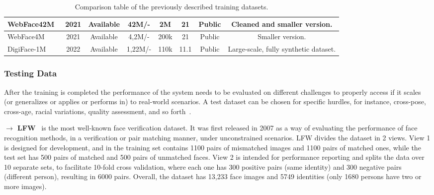 \documentclass[class=report, crop=false, a4paper, 12pt]{standalone}
\begin{document}
\begin{table}[!ht]
{\begin{tabular}{|l|c|c|c|c|c|c|c|}
    WebFace42M~\autocite{zhuWebFace260MBenchmarkUnveiling2021}                             & 2021          & Available                  & 42M/-                  & 2M             & 21                    & Public                & Cleaned and smaller version.                 \\ \hline
    WebFace4M~\autocite{zhuWebFace260MBenchmarkUnveiling2021}                              & 2021          & Available                  & 4,2M/-                 & 200k           & 21                    & Public                & Smaller version.                 \\ \hline
    DigiFace-1M~\autocite{baeDigiFace1MMillionDigital2023}                            & 2022          & Available                  & 1,22M/-                & 110k           & 11.1                  & Public                & Large-scale, fully synthetic dataset.                 \\ \hline
    \end{tabular}%
    }
    \caption{Comparison table of the previously described training datasets.}
    \label{tab:training data}
\end{table}
\newpage
\subsubsection{\large Testing Data}

\par After the training is completed the performance of the system needs to be evaluated on different challenges to properly access if it scales (or generalizes or applies or performs in) to real-world scenarios. A test dataset can be chosen for specific hurdles, for instance, cross-pose, cross-age, racial variations, quality assessment, and so forth~\autocite{duElementsEndtoendDeep2022}.


\vspace{0.7\baselineskip}
\noindent\textbf{$\rightarrow$ LFW}~\autocite{huangLabeledFacesWild} is the most well-known face verification dataset. It was first released in 2007 as a way of evaluating the performance of face recognition methods, in a verification or pair matching manner, under unconstrained scenarios. LFW divides the dataset in 2 views. View 1 is designed for development, and in the training set contains 1100 pairs of mismatched images and 1100 pairs of matched ones, while the test set has 500 pairs of matched and 500 pairs of unmatched faces. View 2 is intended for performance reporting and splits the data over 10 separate sets, to facilitate 10-fold cross validation, where each one has 300 positive pairs (same identity) and 300 negative pairs (different person), resulting in 6000 pairs. Overall, the dataset has 13,233 face images and 5749 identities (only 1680 persons have two or more images).
\end{document}
